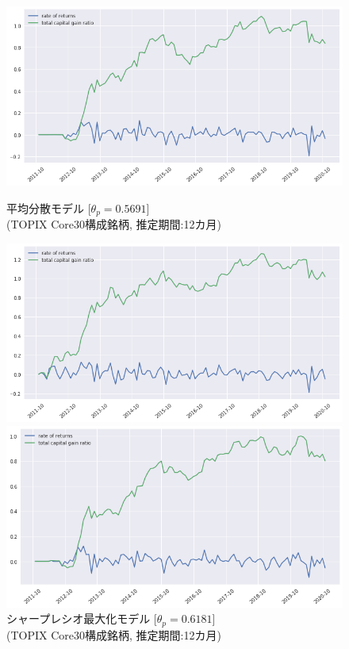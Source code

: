 \documentclass[dvipdfmx,autodetect-engine]{jsarticle}
\begin{document}
\begin{figure}[htbp]
\begin{minipage}{0.5\hsize}
\begin{center}
\includegraphics[width=1.0\hsize]{./figures/mmvp_tpx30_w=12_plot.png}
\end{center}
\caption{\small 平均分散モデル [$\theta_p=0.5691$]\\(TOPIX Core30構成銘柄, 推定期間:12カ月)}
\label{fig:11}
\end{minipage}
\begin{minipage}{0.5\hsize}
\begin{center}
\includegraphics[width=1.0\hsize]{./figures/srmp_tpx30_w=12_plot.png}
\end{center}
\caption{\small シャープレシオ最大化モデル [$\theta_p=0.6181$]\\(TOPIX Core30構成銘柄, 推定期間:12カ月)}
\label{fig:12}
\end{minipage}
\begin{minipage}{0.5\hsize}
\begin{center}
\includegraphics[width=1.0\hsize]{./figures/mmvp_tpx30_w=36_plot.png}

\end{center}
\end{minipage}
\end{figure}
\end{document}
